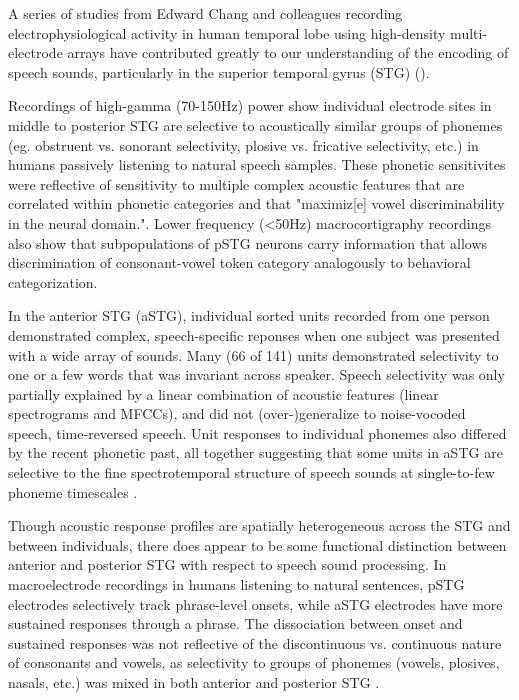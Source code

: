 A series of studies from Edward Chang and colleagues recording electrophysiological activity in human temporal lobe using high-density multi-electrode arrays have contributed greatly to our understanding of the encoding of speech sounds, particularly in the superior temporal gyrus (STG) ()\cite{yiEncodingSpeechSounds2019}. 

Recordings of high-gamma (70-150Hz) power show individual electrode sites in middle to posterior STG are selective to acoustically similar groups of phonemes (eg. obstruent vs. sonorant selectivity, plosive vs. fricative selectivity, etc.) in humans passively listening to natural speech samples\cite{mesgaraniPhoneticFeatureEncoding2014}. These phonetic sensitivites were reflective of sensitivity to multiple complex acoustic features that are correlated within phonetic categories and that "maximiz[e] vowel discriminability in the neural domain."\cite{mesgaraniPhoneticFeatureEncoding2014}. Lower frequency (<50Hz) macrocortigraphy recordings also show that subpopulations of pSTG neurons carry information that allows discrimination of consonant-vowel token category analogously to behavioral categorization\cite{changCategoricalSpeechRepresentation2010b}. 

In the anterior STG (aSTG), individual sorted units recorded from one person demonstrated complex, speech-specific reponses when one subject was presented with a wide array of sounds\cite{chanSpeechSpecificTuningNeurons2014}. Many (66 of 141) units demonstrated selectivity to one or a few words that was invariant across speaker. Speech selectivity was only partially explained by a linear combination of acoustic features (linear spectrograms and MFCCs), and did not (over-)generalize to noise-vocoded speech, time-reversed speech. Unit responses to individual phonemes also differed by the recent phonetic past, all together suggesting that some units in aSTG are selective to the fine spectrotemporal structure of speech sounds at single-to-few phoneme timescales \cite{chanSpeechSpecificTuningNeurons2014}. 

Though acoustic response profiles are spatially heterogeneous across the STG and between individuals\cite{mesgaraniPhoneticFeatureEncoding2014,hamiltonSpatialMapOnset2018a}, there does appear to be some functional distinction between anterior and posterior STG with respect to speech sound processing. In macroelectrode recordings in humans listening to natural sentences, pSTG electrodes selectively track phrase-level onsets, while aSTG electrodes have more sustained responses through a phrase. The dissociation between onset and sustained responses was not reflective of the discontinuous vs. continuous nature of consonants and vowels, as selectivity to groups of phonemes (vowels, plosives, nasals, etc.) was mixed in both anterior and posterior STG \cite{hamiltonSpatialMapOnset2018a}. 

